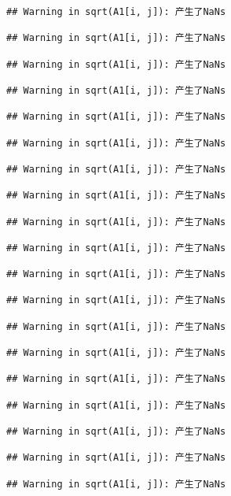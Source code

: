 \documentclass[]{article}
\newenvironment{Shaded}{\begin{snugshade}}{\end{snugshade}}
\newcommand{\DecValTok}[1]{\textcolor[rgb]{0.00,0.00,0.81}{#1}}
\newcommand{\StringTok}[1]{\textcolor[rgb]{0.31,0.60,0.02}{#1}}
\newcommand{\OperatorTok}[1]{\textcolor[rgb]{0.81,0.36,0.00}{\textbf{#1}}}
\newcommand{\NormalTok}[1]{#1}
\begin{document}
\begin{verbatim}
## Warning in sqrt(A1[i, j]): 产生了NaNs

## Warning in sqrt(A1[i, j]): 产生了NaNs

## Warning in sqrt(A1[i, j]): 产生了NaNs

## Warning in sqrt(A1[i, j]): 产生了NaNs

## Warning in sqrt(A1[i, j]): 产生了NaNs

## Warning in sqrt(A1[i, j]): 产生了NaNs

## Warning in sqrt(A1[i, j]): 产生了NaNs

## Warning in sqrt(A1[i, j]): 产生了NaNs

## Warning in sqrt(A1[i, j]): 产生了NaNs

## Warning in sqrt(A1[i, j]): 产生了NaNs

## Warning in sqrt(A1[i, j]): 产生了NaNs

## Warning in sqrt(A1[i, j]): 产生了NaNs

## Warning in sqrt(A1[i, j]): 产生了NaNs

## Warning in sqrt(A1[i, j]): 产生了NaNs

## Warning in sqrt(A1[i, j]): 产生了NaNs

## Warning in sqrt(A1[i, j]): 产生了NaNs

## Warning in sqrt(A1[i, j]): 产生了NaNs

## Warning in sqrt(A1[i, j]): 产生了NaNs

## Warning in sqrt(A1[i, j]): 产生了NaNs
\end{verbatim}

\begin{Shaded}
\end{Shaded}
\end{document}
